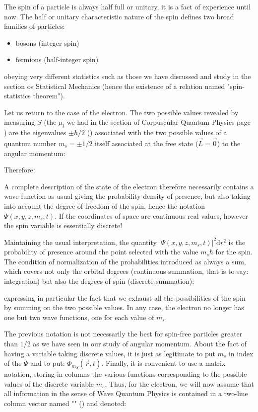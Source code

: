 	The spin of a particle is always half full or unitary, it is a fact of experience until now. The half or unitary characteristic nature of the spin defines two broad families of particles:
	\begin{itemize}
		\item bosons (integer spin)
		
		\item fermions (half-integer spin)
	\end{itemize}  	
	obeying very different statistics such as those we have discussed and study in the section os Statistical Mechanics (hence the existence of a relation named "spin-statistics theorem").

	Let us return to the case of the electron. The two possible values revealed by measuring $S$ (the $\mu_l$ we had in the section of Corpuscular Quantum Physics page \pageref{magnetic dipole moment}) are the eigenvalues $\pm\hbar/2$ () associated with the two possible values of a quantum number $m_s=\pm 1/2$ itself associated at the free state ($\vec{L}=\vec{0}$) to the angular momentum:
	
	Therefore:
	
	A complete description of the state of the electron therefore necessarily contains a wave function as usual giving the probability density of presence, but also taking into account the degree of freedom of the spin, hence the notation $\Psi(x,y,z,m_s,t)$. If the coordinates of space are continuous real values, however the spin variable is essentially discrete!
	
	Maintaining the usual interpretation, the quantity $|\Psi(x,y,z,m_s,t)|^2\mathrm{d}r^2$ is the probability of presence around the point selected with the value $m_s\hbar$ for the spin. The condition of normalization of the probabilities introduced as always a sum, which covers not only the orbital degrees (continuous summation, that is to say: integration) but also the degrees of spin (discrete summation):
	
	expressing in particular the fact that we exhaust all the possibilities of the spin by summing on the two possible values. In any case, the electron no longer has one but two wave functions, one for each value of $m_s$.
	
	The previous notation is not necessarily the best for spin-free particles greater than $1/2$ as we have seen in our study of angular momentum. About the fact of having  a variable taking discrete values, it is just as legitimate to put $m_s$ in index of the $\Psi$ and to put: $\Phi_{m_S}(\vec{r},t)$. Finally, it is convenient to use a matrix notation, storing in columns the various functions corresponding to the possible values of the discrete variable $m_s$. Thus, for the electron, we will now assume that all information in the sense of Wave Quantum Physics is contained in a two-line column vector named "\label{spinor relativistic quantum physics}" () and denoted:
	
